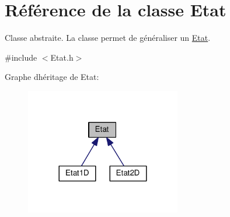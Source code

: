 \hypertarget{class_etat}{}\section{Référence de la classe Etat}
\label{class_etat}


Classe abstraite. La classe permet de généraliser un \hyperlink{class_etat}{Etat}.  




{\ttfamily \#include $<$Etat.\+h$>$}



Graphe d\textquotesingle{}héritage de Etat\+:
\nopagebreak
\begin{figure}[H]
\begin{center}
\leavevmode
\includegraphics[width=192pt]{class_etat__inherit__graph}
\end{center}
\end{figure}
